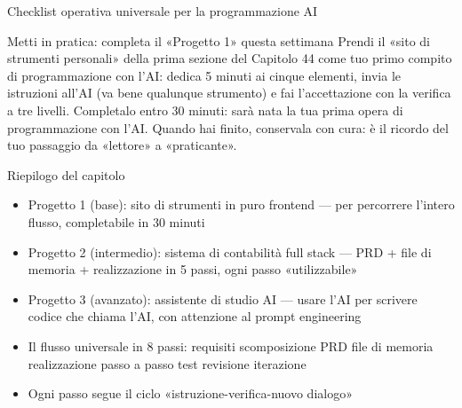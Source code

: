 \begin{center}\small\color{gray}Checklist operativa universale per la programmazione AI\end{center}

\begin{tcbpractice}{Metti in pratica: completa il «Progetto 1» questa settimana}
Prendi il «sito di strumenti personali» della prima sezione del Capitolo 44 come tuo primo compito di programmazione con l'AI: dedica 5 minuti ai cinque elementi, invia le istruzioni all'AI (va bene qualunque strumento) e fai l'accettazione con la verifica a tre livelli. Completalo entro 30 minuti: sarà nata la tua prima opera di programmazione con l'AI. Quando hai finito, conservala con cura: è il ricordo del tuo passaggio da «lettore» a «praticante».

\end{tcbpractice}

\begin{tcbsummary}{Riepilogo del capitolo}
\begin{itemize}
  \item Progetto 1 (base): sito di strumenti in puro frontend — per percorrere l'intero flusso, completabile in 30 minuti
  \item Progetto 2 (intermedio): sistema di contabilità full stack — PRD + file di memoria + realizzazione in 5 passi, ogni passo «utilizzabile»
  \item Progetto 3 (avanzato): assistente di studio AI — usare l'AI per scrivere codice che chiama l'AI, con attenzione al prompt engineering
  \item Il flusso universale in 8 passi: requisiti scomposizione PRD file di memoria realizzazione passo a passo test revisione iterazione
  \item Ogni passo segue il ciclo «istruzione-verifica-nuovo dialogo»
\end{itemize}

\end{tcbsummary}
